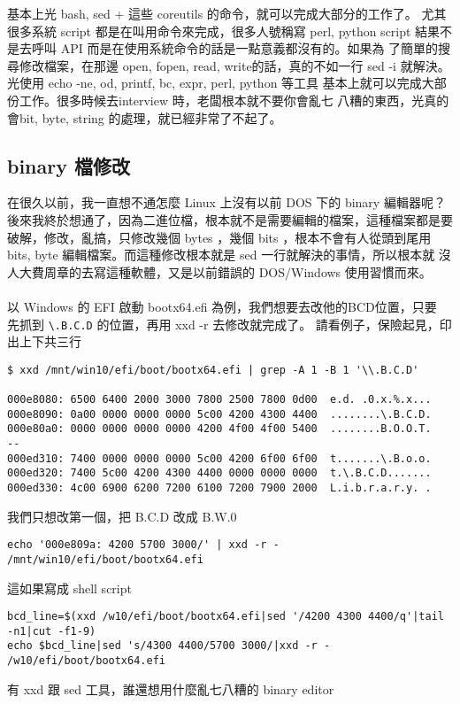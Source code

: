     基本上光 bash, sed + 這些 coreutils 的命令，就可以完成大部分的工作了。
    尤其很多系統 script 都是在叫用命令來完成，很多人號稱寫 perl, python
    script 結果不是去呼叫 API 而是在使用系統命令的話是一點意義都沒有的。如果為
    了簡單的搜尋修改檔案，在那邊 open, fopen, read, write的話，真的不如一行
    sed -i 就解決。光使用 echo -ne, od, printf, bc, expr, perl, python 等工具
    基本上就可以完成大部份工作。很多時候去interview 時，老闆根本就不要你會亂七
    八糟的東西，光真的會bit, byte, string 的處理，就已經非常了不起了。

    \subsection{binary 檔修改}
    在很久以前，我一直想不通怎麼 Linux 上沒有以前 DOS 下的 binary 編輯器呢？
    後來我終於想通了，因為二進位檔，根本就不是需要編輯的檔案，這種檔案都是要
    破解，修改，亂搞，只修改幾個 bytes ，幾個 bits ，根本不會有人從頭到尾用
    bits, byte 編輯檔案。而這種修改根本就是 sed 一行就解決的事情，所以根本就
    沒人大費周章的去寫這種軟體，又是以前錯誤的 DOS/Windows 使用習慣而來。
    \\\\
    以 Windows 的 EFI 啟動 bootx64.efi 為例，我們想要去改他的BCD位置，只要
    先抓到 \verb=\.B.C.D= 的位置，再用 xxd -r 去修改就完成了。
    請看例子，保險起見，印出上下共三行
    \begin{verbatim}
$ xxd /mnt/win10/efi/boot/bootx64.efi | grep -A 1 -B 1 '\\.B.C.D'

000e8080: 6500 6400 2000 3000 7800 2500 7800 0d00  e.d. .0.x.%.x...
000e8090: 0a00 0000 0000 0000 5c00 4200 4300 4400  ........\.B.C.D.
000e80a0: 0000 0000 0000 0000 4200 4f00 4f00 5400  ........B.O.O.T.
--
000ed310: 7400 0000 0000 0000 5c00 4200 6f00 6f00  t.......\.B.o.o.
000ed320: 7400 5c00 4200 4300 4400 0000 0000 0000  t.\.B.C.D.......
000ed330: 4c00 6900 6200 7200 6100 7200 7900 2000  L.i.b.r.a.r.y. .
    \end{verbatim}
    我們只想改第一個，把 B.C.D 改成 B.W.0
    \begin{verbatim}
echo '000e809a: 4200 5700 3000/' | xxd -r - /mnt/win10/efi/boot/bootx64.efi
    \end{verbatim}
    這如果寫成 shell script
    \begin{verbatim}
bcd_line=$(xxd /w10/efi/boot/bootx64.efi|sed '/4200 4300 4400/q'|tail -n1|cut -f1-9)
echo $bcd_line|sed 's/4300 4400/5700 3000/|xxd -r - /w10/efi/boot/bootx64.efi
    \end{verbatim}
    有 xxd 跟 sed 工具，誰還想用什麼亂七八糟的 binary editor
